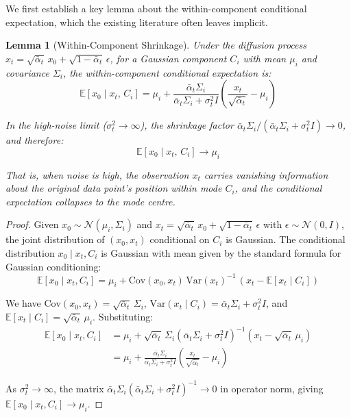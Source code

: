 \documentclass[11pt]{article}
\newtheorem{lemma}[theorem]{Lemma}
\begin{document}
We first establish a key lemma about the within-component conditional expectation, which the existing literature often leaves implicit.

\begin{lemma}[Within-Component Shrinkage]\label{lem:shrinkage}
Under the diffusion process $x_t = \sqrt{\bar{\alpha}_t}\, x_0 + \sqrt{1 - \bar{\alpha}_t}\, \epsilon$, for a Gaussian component $C_i$ with mean $\mu_i$ and covariance $\Sigma_i$, the within-component conditional expectation is:
$$\mathbb{E}[x_0 \mid x_t,\, C_i] = \mu_i + \frac{\bar{\alpha}_t \Sigma_i}{\bar{\alpha}_t \Sigma_i + \sigma_t^2 I}\left(\frac{x_t}{\sqrt{\bar{\alpha}_t}} - \mu_i\right)$$

In the high-noise limit ($\sigma_t^2 \to \infty$), the shrinkage factor $\bar{\alpha}_t \Sigma_i / (\bar{\alpha}_t \Sigma_i + \sigma_t^2 I) \to 0$, and therefore:
$$\mathbb{E}[x_0 \mid x_t,\, C_i] \to \mu_i$$

That is, when noise is high, the observation $x_t$ carries vanishing information about the original data point's position within mode $C_i$, and the conditional expectation collapses to the mode centre.
\end{lemma}

\begin{proof}
Given $x_0 \sim \mathcal{N}(\mu_i, \Sigma_i)$ and $x_t = \sqrt{\bar{\alpha}_t}\, x_0 + \sqrt{1 - \bar{\alpha}_t}\, \epsilon$ with $\epsilon \sim \mathcal{N}(0, I)$, the joint distribution of $(x_0, x_t)$ conditional on $C_i$ is Gaussian. The conditional distribution $x_0 \mid x_t, C_i$ is Gaussian with mean given by the standard formula for Gaussian conditioning:
$$\mathbb{E}[x_0 \mid x_t, C_i] = \mu_i + \mathrm{Cov}(x_0, x_t)\, \mathrm{Var}(x_t)^{-1}\, (x_t - \mathbb{E}[x_t \mid C_i])$$

We have $\mathrm{Cov}(x_0, x_t) = \sqrt{\bar{\alpha}_t}\, \Sigma_i$, $\mathrm{Var}(x_t \mid C_i) = \bar{\alpha}_t \Sigma_i + \sigma_t^2 I$, and $\mathbb{E}[x_t \mid C_i] = \sqrt{\bar{\alpha}_t}\, \mu_i$. Substituting:
\begin{align*}
\mathbb{E}[x_0 \mid x_t, C_i] &= \mu_i + \sqrt{\bar{\alpha}_t}\, \Sigma_i \left(\bar{\alpha}_t \Sigma_i + \sigma_t^2 I\right)^{-1} \left(x_t - \sqrt{\bar{\alpha}_t}\, \mu_i\right) \\
&= \mu_i + \frac{\bar{\alpha}_t \Sigma_i}{\bar{\alpha}_t \Sigma_i + \sigma_t^2 I}\left(\frac{x_t}{\sqrt{\bar{\alpha}_t}} - \mu_i\right)
\end{align*}

As $\sigma_t^2 \to \infty$, the matrix $\bar{\alpha}_t \Sigma_i (\bar{\alpha}_t \Sigma_i + \sigma_t^2 I)^{-1} \to 0$ in operator norm, giving $\mathbb{E}[x_0 \mid x_t, C_i] \to \mu_i$.
\end{proof}
\end{document}
